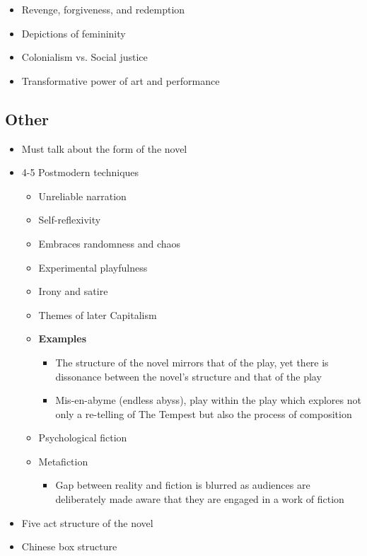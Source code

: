 		\begin{itemize}
			\item Revenge, forgiveness, and redemption
			\item Depictions of femininity
			\item Colonialism vs. Social justice
			\item Transformative power of art and performance
		\end{itemize}

	\subsection{Other}
	
		\begin{itemize}
			\item Must talk about the form of the novel
			\item 4-5 Postmodern techniques
				\begin{itemize}
					\item Unreliable narration
					\item Self-reflexivity
					\item Embraces randomness and chaos
					\item Experimental playfulness
					\item Irony and satire
					\item Themes of later Capitalism
					\item \textbf{Examples}
						\begin{itemize}
							\item The structure of the novel mirrors that of the play, yet there is dissonance between the novel's structure and that of the play
							\item Mis-en-abyme (endless abyss), play within the play which explores not only a re-telling of The Tempest but also the process of composition
						\end{itemize}
					\item Psychological fiction
					\item Metafiction
						\begin{itemize}
							\item Gap between reality and fiction is blurred as audiences are deliberately made aware that they are engaged in a work of fiction
						\end{itemize}
				\end{itemize}
			\item Five act structure of the novel
			\item Chinese box structure
		\end{itemize}

